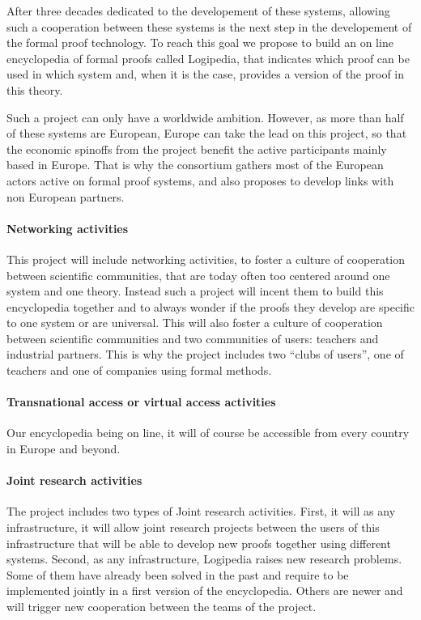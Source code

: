 After three decades dedicated to the developement of these systems,
allowing such a cooperation between these systems is the next step in
the developement of the formal proof technology.  To reach this goal
we propose to build an on line encyclopedia of formal proofs called
{\sc Logipedia}, that indicates which proof can be used in which
system and, when it is the case, provides a version of the proof in
this theory.

Such a project can only have a worldwide ambition. However, as more
than half of these systems are European, Europe can take the lead on
this project, so that the economic spinoffs from the project benefit
the active participants mainly based in Europe.  That is why the
consortium gathers most of the European actors active on formal proof
systems, and also proposes to develop links with non European
partners.


\paragraph{Networking activities}
This project will include networking activities, to foster a culture
of cooperation between scientific communities, that are today often
too centered around one system and one theory. Instead such a project
will incent them to build this encyclopedia together and to always
wonder if the proofs they develop are specific to one system or are
universal. This will also foster a culture of cooperation between
scientific communities and two communities of users: teachers and
industrial partners. This is why the project includes two ``clubs of
users'', one of teachers and one of companies using formal methods.

\paragraph{Transnational access or virtual access activities}
Our encyclopedia being on line, it will of course be accessible from
every country in Europe and beyond.

\paragraph{Joint research activities}
The project includes two types of Joint research activities.  First,
it will as any infrastructure, it will allow joint research projects
between the users of this infrastructure that will be able to develop
new proofs together using different systems. Second, as any
infrastructure, {\sc Logipedia} raises new research problems. Some of
them have already been solved in the past and require to be
implemented jointly in a first version of the encyclopedia. Others are
newer and will trigger new cooperation between the teams of the project.


